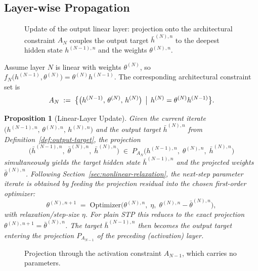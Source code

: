 \documentclass{article}
\theoremstyle{plain}
\newtheorem{proposition}[theorem]{Proposition}
\theoremstyle{definition}
\theoremstyle{remark}
\begin{document}
\subsection{Layer-wise Propagation}
 
\begin{figure}[htbp]
\centering
\resizebox{\textwidth}{!}{%

}
\caption{Update of the output linear layer: projection onto the architectural constraint
$A_{N}$ couples the output target $\bar{h}^{(N),n}$ to the deepest hidden state
$h^{(N-1),n}$ and the weights $\theta^{(N),n}$.}
\label{fig:next_back_prop}
\end{figure}
 
Assume layer $N$ is linear with weights $\theta^{(N)}$, so
$f_N\bigl(h^{(N-1)},\theta^{(N)}\bigr) = \theta^{(N)} h^{(N-1)}$. The corresponding
architectural constraint set is
\[
A_{N} \;:=\; \bigl\{\bigl(h^{(N-1)},\, \theta^{(N)},\, h^{(N)}\bigr)
\,\bigm|\, h^{(N)} = \theta^{(N)} h^{(N-1)} \bigr\}.
\]
 
\begin{proposition}[Linear-Layer Update]
\label{prop:linear-layer}
Given the current iterate $\bigl(h^{(N-1),n},\, \theta^{(N),n},\, h^{(N),n}\bigr)$ and the
output target $\bar{h}^{(N),n}$ from Definition~\ref{def:output-target}, the projection
\begin{equation}
\bigl(\bar{h}^{(N-1),n},\; \bar{\theta}^{(N),n},\; \bar{h}^{(N),n}\bigr)
\;\in\; P_{A_{N}}\!\bigl(h^{(N-1),n},\; \theta^{(N),n},\; \bar{h}^{(N),n}\bigr)
\end{equation}
simultaneously yields the target hidden state $\bar{h}^{(N-1),n}$ and the projected weights
$\bar{\theta}^{(N),n}$. Following Section~\ref{sec:nonlinear-relaxation}, the next-step
parameter iterate is obtained by feeding the projection residual into the chosen first-order
optimizer:
\begin{equation}
\theta^{(N),n+1}
\;=\; \mathrm{Optimizer}\!\bigl(\theta^{(N),n},\; \eta,\;
       \theta^{(N),n} - \bar{\theta}^{(N),n}\bigr),
\end{equation}
with relaxation/step-size $\eta$. For plain STP this reduces to the exact projection
$\theta^{(N),n+1} = \bar{\theta}^{(N),n}$. The target $\bar{h}^{(N-1),n}$ then becomes the
output target entering the projection $P_{A_{N-1}}$ of the preceding (activation) layer.
\end{proposition}
 
\begin{figure}[htbp]
\centering
\resizebox{0.78\textwidth}{!}{%

}
\caption{Projection through the activation constraint $A_{N-1}$, which carries no
parameters.}
\label{fig:next_back_prop_mid}
\end{figure}
 
\end{document}

